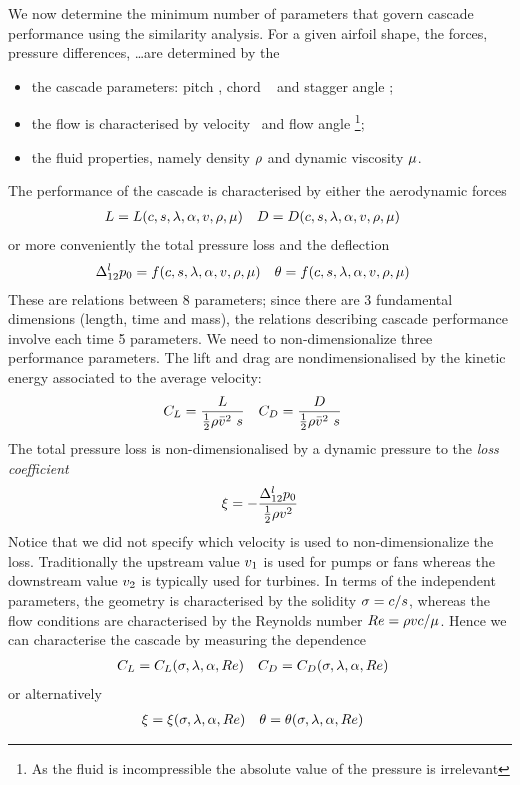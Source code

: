 We now determine the minimum number of parameters that govern cascade
performance using the similarity analysis. For a given airfoil shape,
the forces, pressure differences, \ldots are determined by the
\begin{itemize}
\item the cascade parameters: pitch \pitch, chord \chord~ and stagger
  angle \stagger;
\item the flow is characterised by velocity \aVel~and flow angle
  \aFlowAngle\footnote{As the fluid is incompressible the absolute
    value of the pressure is irrelevant};
\item the fluid properties, namely density $\rho$ and dynamic
  viscosity $\mu$.
\end{itemize}
The performance of the cascade is characterised by either the aerodynamic forces
\begin{align*}
  L &= L(c,s,\lambda,\alpha,v,\rho,\mu) & 
  D &= D(c,s,\lambda,\alpha,v,\rho,\mu) 
\end{align*}
or more conveniently the total pressure loss and the deflection
\begin{align*}
  \Delta_{12}^l p_{0} &= f(c,s,\lambda,\alpha,v,\rho,\mu) &
  \theta &= f(c,s,\lambda,\alpha,v,\rho,\mu) 
\end{align*}
These are relations between 8 parameters; since there are 3
fundamental dimensions (length, time and mass), the relations
describing cascade performance involve each time 5 parameters. We need
to non-dimensionalize three performance parameters. The lift and drag
are nondimensionalised by the kinetic energy associated to the average
velocity:
\begin{align*}
  C_{L} &= \frac{L}{\frac{1}{2} \rho \bar {v}^2~s} & 
  C_{D} &= \frac{D}{\frac{1}{2} \rho \bar {v}^2~s}
\end{align*}
The total pressure loss is non-dimensionalised by a dynamic pressure
to the \emph{loss coefficient}
\begin{align*}
  \xi = - \frac{\Delta_{12}^l p_{0}}{\frac{1}{2} \rho v^2}
\end{align*}
Notice that we did not specify which velocity is used to
non-dimensionalize the loss. Traditionally the upstream value
$v_1$ is used for pumps or fans whereas the downstream value
$v_2$ is typically used for turbines.  In terms of the independent
parameters, the geometry is characterised by the solidity $\sigma =
c/s$, whereas the flow conditions are characterised by the
Reynolds number $Re=\rho v c/\mu$. Hence we can
characterise the cascade by measuring the dependence
\begin{align*}
  C_{L} &= C_{L}(\sigma,\lambda,\alpha,Re) & 
  C_{D} &= C_{D}(\sigma,\lambda,\alpha,Re)
\end{align*}
or alternatively
\begin{align*}
  \xi &=   \xi(\sigma,\lambda,\alpha,Re) &
  \theta &= \theta(\sigma,\lambda,\alpha,Re)
\end{align*}

